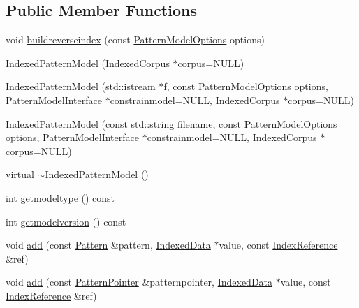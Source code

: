\subsection*{Public Member Functions}
\begin{DoxyCompactItemize}
\item 
void \hyperlink{classIndexedPatternModel_a0d53765f0498911c976744cc3670ff72}{buildreverseindex} (const \hyperlink{classPatternModelOptions}{Pattern\+Model\+Options} options)
\item 
\hyperlink{classIndexedPatternModel_af2fbb7d1f40210bda30bee3d5577546a}{Indexed\+Pattern\+Model} (\hyperlink{classIndexedCorpus}{Indexed\+Corpus} $\ast$corpus=N\+U\+L\+L)
\item 
\hyperlink{classIndexedPatternModel_a983367ac09e96735a2075a1f780d1de4}{Indexed\+Pattern\+Model} (std\+::istream $\ast$f, const \hyperlink{classPatternModelOptions}{Pattern\+Model\+Options} options, \hyperlink{classPatternModelInterface}{Pattern\+Model\+Interface} $\ast$constrainmodel=N\+U\+L\+L, \hyperlink{classIndexedCorpus}{Indexed\+Corpus} $\ast$corpus=N\+U\+L\+L)
\item 
\hyperlink{classIndexedPatternModel_a8d49b0f8aea957fc80e7e8d7b4dd5ba8}{Indexed\+Pattern\+Model} (const std\+::string filename, const \hyperlink{classPatternModelOptions}{Pattern\+Model\+Options} options, \hyperlink{classPatternModelInterface}{Pattern\+Model\+Interface} $\ast$constrainmodel=N\+U\+L\+L, \hyperlink{classIndexedCorpus}{Indexed\+Corpus} $\ast$corpus=N\+U\+L\+L)
\item 
virtual \hyperlink{classIndexedPatternModel_aadc89a95b7ef0874ab5d763d0c453e79}{$\sim$\+Indexed\+Pattern\+Model} ()
\item 
int \hyperlink{classIndexedPatternModel_adeb6b2bce5dc4fcdd9f8ec9f723d0f5b}{getmodeltype} () const 
\item 
int \hyperlink{classIndexedPatternModel_adabaad88e64edd1c4762a56c86d1bae4}{getmodelversion} () const 
\item 
void \hyperlink{classIndexedPatternModel_a41367fc32c9fa72d1a88e60d749015a5}{add} (const \hyperlink{classPattern}{Pattern} \&pattern, \hyperlink{classIndexedData}{Indexed\+Data} $\ast$value, const \hyperlink{classIndexReference}{Index\+Reference} \&ref)
\item 
void \hyperlink{classIndexedPatternModel_a83e3a00515a9ad419b4a2f820278c5f7}{add} (const \hyperlink{classPatternPointer}{Pattern\+Pointer} \&patternpointer, \hyperlink{classIndexedData}{Indexed\+Data} $\ast$value, const \hyperlink{classIndexReference}{Index\+Reference} \&ref)

\end{DoxyCompactItemize}
